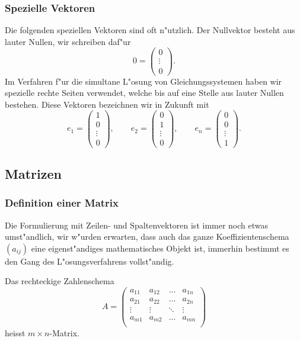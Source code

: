 \subsubsection{Spezielle Vektoren\label{speziellevektoren}}
Die folgenden speziellen Vektoren sind oft n"utzlich. Der Nullvektor besteht
aus lauter Nullen, wir schreiben daf"ur
$$0=\begin{pmatrix}0\\\vdots\\0\end{pmatrix}.$$
Im Verfahren f"ur die simultane L"osung von Gleichungssystemen haben
wir spezielle rechte Seiten verwendet, welche bis auf eine Stelle aus lauter
Nullen bestehen. Diese Vektoren bezeichnen wir in Zukunft mit
$$e_1=\begin{pmatrix}1\\0\\\vdots\\0\end{pmatrix},
\qquad
e_2=\begin{pmatrix}0\\1\\\vdots\\0\end{pmatrix},
\qquad
e_n=\begin{pmatrix}0\\0\\\vdots\\1\end{pmatrix}.
$$

\subsection{Matrizen}
\subsubsection{Definition einer Matrix}
Die Formulierung mit Zeilen- und Spaltenvektoren ist immer noch etwas umst"andlich,
wir w"urden erwarten, dass auch das ganze Koeffizientenschema $(a_{ij})$
eine eigenst"andiges mathematisches Objekt ist, immerhin bestimmt es den
Gang des L"osungsverfahrens vollst"andig. 

\begin{definition}
Das rechteckige Zahlenschema
$$
A=
\begin{pmatrix}
a_{11}&a_{12}&\dots&a_{1n}\\
a_{21}&a_{22}&\dots&a_{2n}\\
\vdots&\vdots&\ddots&\vdots\\
a_{m1}&a_{m2}&\dots&a_{mn}\\
\end{pmatrix}
$$
heisst $m\times n$-Matrix.
\end{definition}

